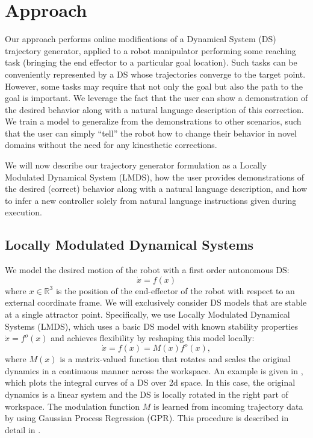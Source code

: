 
\section{Approach}
\label{sec:approach}

Our approach performs online modifications of a Dynamical System (DS) trajectory generator, applied to a robot manipulator performing some reaching task (bringing the end effector to a particular goal location).
Such tasks can be conveniently represented by a DS whose trajectories converge to the target point.
However, some tasks may require that not only the goal but also the path to the goal is important.
We leverage the fact that the user can show a demonstration of the desired behavior along with a natural language description of this correction.
We train a model to generalize from the demonstrations to other scenarios, such that the user can simply ``tell'' the robot how to change their behavior in novel domains without the need for any kinesthetic corrections.

We will now describe our trajectory generator formulation as a Locally Modulated Dynamical System (LMDS), how the user provides demonstrations of the desired (correct) behavior along with a natural language description, and how to infer a new controller solely from natural language instructions given during execution.

\subsection{Locally Modulated Dynamical Systems}

We model the desired motion of the robot with a first order autonomous DS:
\begin{equation}
  \label{eq:DS_general}
  \dot x = f(x)
\end{equation}
where $x \in \mathbb{R}^3$ is the position of the end-effector of the robot with respect to an external coordinate frame.
We will exclusively consider DS models that are stable at a single attractor point.
Specifically, we use Locally Modulated Dynamical Systems (LMDS), which uses a basic DS model with known stability properties $\dot x = f^o(x)$ and achieves flexibility by reshaping this model locally:
\begin{equation}
  \label{eq:DS_reshaped}
  \dot x = f(x) = M(x)f^o(x),
\end{equation}
where $M(x)$ is a matrix-valued function that rotates and scales the original dynamics in a continuous manner across the workspace.
An example is given in , which plots the integral curves of a DS over 2d space.
In this case, the original dynamics is a linear system and the DS is locally rotated in the right part of workspace.
The modulation function $M$ is learned from incoming trajectory data by using Gaussian Process Regression (GPR).
 This procedure is described in detail in \cite{Kronander2015}.


